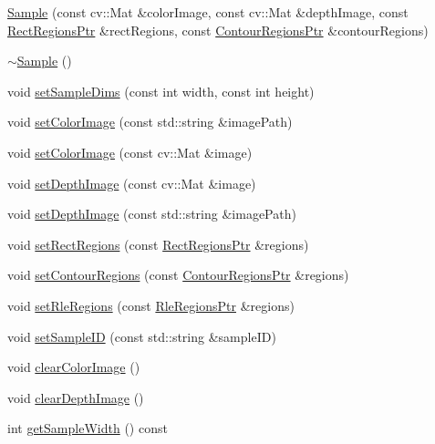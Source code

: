 \begin{DoxyCompactItemize}
\hyperlink{struct_sample_a40041d82410fa312c6b1fa9f2ebb577b}{Sample} (const cv\+::\+Mat \&color\+Image, const cv\+::\+Mat \&depth\+Image, const \hyperlink{_rect_regions_8h_af395a1050a923eecf6862568feaf5d1d}{Rect\+Regions\+Ptr} \&rect\+Regions, const \hyperlink{_contour_regions_8h_a3a7590ecfb061e3c09270d38b53671ef}{Contour\+Regions\+Ptr} \&contour\+Regions)
\item 
\hyperlink{struct_sample_aea8a48c34d94596f6affbbd28938fb2c}{$\sim$\+Sample} ()
\item 
void \hyperlink{struct_sample_abf2406fa93155628a56b7087ff322ab4}{set\+Sample\+Dims} (const int width, const int height)
\item 
void \hyperlink{struct_sample_a37c84ccbf7cbc37823327da68037c51a}{set\+Color\+Image} (const std\+::string \&image\+Path)
\item 
void \hyperlink{struct_sample_a8a506a461c09213d2bcc87b00aafa420}{set\+Color\+Image} (const cv\+::\+Mat \&image)
\item 
void \hyperlink{struct_sample_a1a140ca4aa294de160581251fe5072e5}{set\+Depth\+Image} (const cv\+::\+Mat \&image)
\item 
void \hyperlink{struct_sample_aa56728d1891ddc907d6d379f44deada3}{set\+Depth\+Image} (const std\+::string \&image\+Path)
\item 
void \hyperlink{struct_sample_a9654dcf85e7a0b19b7b462cd7e6e1e6a}{set\+Rect\+Regions} (const \hyperlink{_rect_regions_8h_af395a1050a923eecf6862568feaf5d1d}{Rect\+Regions\+Ptr} \&regions)
\item 
void \hyperlink{struct_sample_afd5668ff78c7745c33b104cdf8ddddda}{set\+Contour\+Regions} (const \hyperlink{_contour_regions_8h_a3a7590ecfb061e3c09270d38b53671ef}{Contour\+Regions\+Ptr} \&regions)
\item 
void \hyperlink{struct_sample_a6716c8c1e8fdcd00d66b2a959a79b507}{set\+Rle\+Regions} (const \hyperlink{_rle_regions_8h_a9bcb41ed7094063e159a665178703e0f}{Rle\+Regions\+Ptr} \&regions)
\item 
void \hyperlink{struct_sample_a64fc306f85a0a1966f5f3b662efe95bb}{set\+Sample\+ID} (const std\+::string \&sample\+ID)
\item 
void \hyperlink{struct_sample_a54f7617fddaaa461fd46320e5bb19201}{clear\+Color\+Image} ()
\item 
void \hyperlink{struct_sample_a7e9518b37a26d5d3788f090808a691ba}{clear\+Depth\+Image} ()
\item 
int \hyperlink{struct_sample_a90e4c417c9b81664bd0027a7ea2aeedc}{get\+Sample\+Width} () const
\item 

\end{DoxyCompactItemize}
